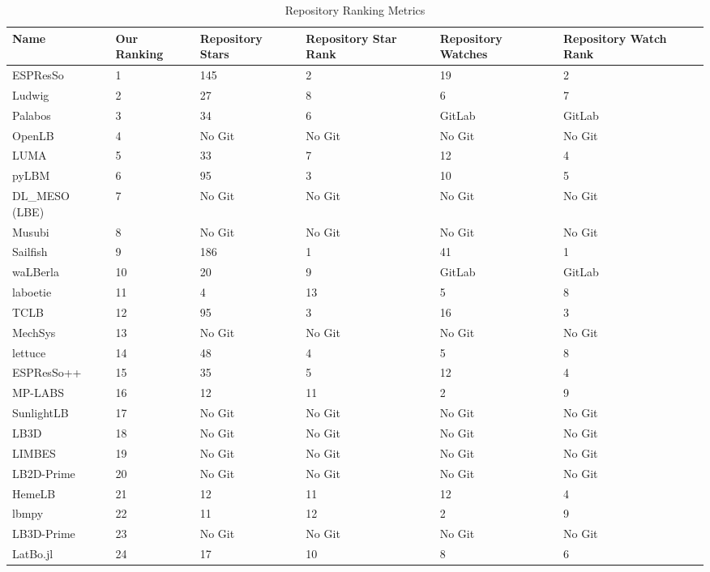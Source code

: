 \documentclass[runningheads]{llncs}
\begin{document}
\begin{table}[!h]
	\begin{center}
		\begin{tabular}{ p{3cm}p{1.25cm}p{1.75cm}p{1.75cm}p{1.75cm}p{1.75cm} }
			\toprule
			Name & Our Ranking & Repository Stars & Repository Star Rank &
			Repository Watches & Repository Watch Rank\\
			\midrule
			ESPResSo & 1 & 145 & 2 & 19& 2\\
			Ludwig & 2 & 27 & 8 & 6& 7\\
			Palabos & 3 & 34 & 6 & GitLab& GitLab\\
			OpenLB & 4 & No Git & No Git & No Git& No Git\\
			LUMA & 5 & 33 & 7 & 12& 4\\
			pyLBM & 6 & 95 & 3 & 10& 5\\
			DL\_MESO (LBE) & 7 & No Git & No Git & No Git & No Git\\
			Musubi & 8 & No Git & No Git & No Git & No Git\\
			Sailfish & 9 & 186 & 1 & 41& 1\\
			waLBerla & 10 & 20 & 9 & GitLab& GitLab\\
			laboetie & 11 & 4 & 13 & 5& 8\\
			TCLB & 12 & 95 & 3 & 16& 3\\
			MechSys & 13 & No Git & No Git & No Git& No Git\\
			lettuce & 14 & 48 & 4 & 5& 8\\
			ESPResSo++ & 15 & 35 & 5 & 12& 4\\
			MP-LABS & 16 & 12 & 11 & 2& 9\\			
			SunlightLB & 17 & No Git & No Git & No Git& No Git\\
			LB3D & 18 & No Git & No Git & No Git& No Git\\			
			LIMBES & 19 & No Git & No Git & No Git& No Git\\
			LB2D-Prime & 20 & No Git & No Git & No Git& No Git\\		
			HemeLB & 21 & 12 & 11 & 12& 4\\
			lbmpy & 22 &  11 & 12 & 2& 9\\	
			LB3D-Prime & 23 & No Git & No Git & No Git& No Git\\	
			LatBo.jl & 24 & 17 & 10 & 8& 6\\			
			\bottomrule
		\end{tabular}
		\caption{Repository Ranking Metrics} \label{repometrics}
	\end{center}
	\end{table}
\end{document}
